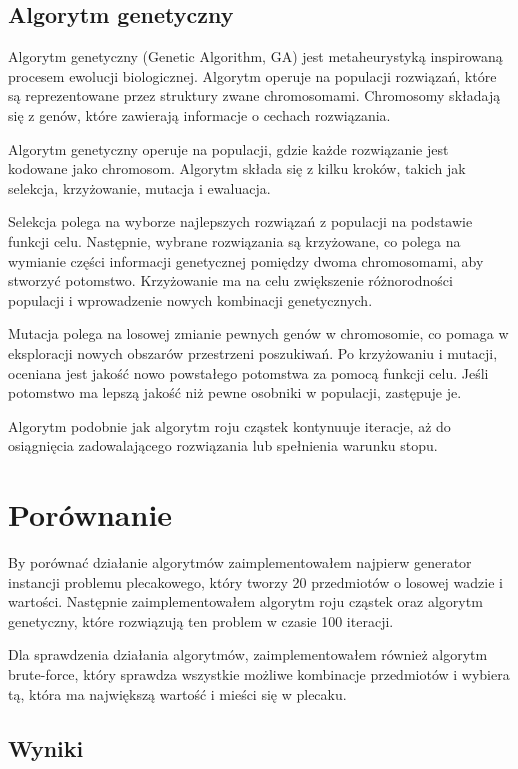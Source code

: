\documentclass{article}
\begin{document}
\subsection{Algorytm genetyczny}

Algorytm genetyczny (Genetic Algorithm, GA) jest metaheurystyką inspirowaną 
procesem ewolucji biologicznej. Algorytm operuje na populacji rozwiązań, które 
są reprezentowane przez struktury zwane chromosomami. Chromosomy składają się 
z genów, które zawierają informacje o cechach rozwiązania.

Algorytm genetyczny operuje na populacji, gdzie każde rozwiązanie jest kodowane 
jako chromosom. Algorytm składa się z kilku kroków, takich jak selekcja, krzyżowanie, mutacja i ewaluacja.

Selekcja polega na wyborze najlepszych rozwiązań z populacji na podstawie funkcji celu. 
Następnie, wybrane rozwiązania są krzyżowane, co polega na wymianie części informacji 
genetycznej pomiędzy dwoma chromosomami, aby stworzyć potomstwo. Krzyżowanie ma na 
celu zwiększenie różnorodności populacji i wprowadzenie nowych kombinacji genetycznych.

Mutacja polega na losowej zmianie pewnych genów w chromosomie, co pomaga w eksploracji 
nowych obszarów przestrzeni poszukiwań. Po krzyżowaniu i mutacji, oceniana jest jakość 
nowo powstałego potomstwa za pomocą funkcji celu. Jeśli potomstwo ma lepszą jakość niż 
pewne osobniki w populacji, zastępuje je.

Algorytm podobnie jak algorytm roju cząstek kontynuuje iteracje, aż do osiągnięcia 
zadowalającego rozwiązania lub spełnienia warunku stopu.

\section{Porównanie}

By porównać działanie algorytmów zaimplementowałem 
najpierw generator instancji problemu plecakowego, który
tworzy 20 przedmiotów o losowej wadzie i wartości. Następnie
zaimplementowałem algorytm roju cząstek oraz algorytm genetyczny,
które rozwiązują ten problem w czasie 100 iteracji.

Dla sprawdzenia działania algorytmów, zaimplementowałem
również algorytm brute-force, który sprawdza wszystkie możliwe
kombinacje przedmiotów i wybiera tą, która ma największą wartość
i mieści się w plecaku.

\subsection{Wyniki}
\end{document}
